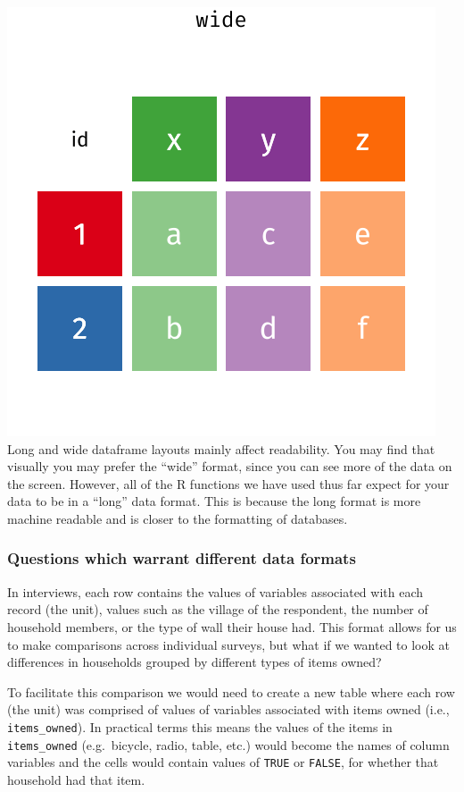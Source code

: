 \documentclass[
]{article}
\begin{document}
\includegraphics{fig/tidyr-pivot_wider_longer.gif} Long and wide
dataframe layouts mainly affect readability. You may find that visually
you may prefer the ``wide'' format, since you can see more of the data
on the screen. However, all of the R functions we have used thus far
expect for your data to be in a ``long'' data format. This is because
the long format is more machine readable and is closer to the formatting
of databases.

\subsubsection{Questions which warrant different data
formats}\label{questions-which-warrant-different-data-formats}

In interviews, each row contains the values of variables associated with
each record (the unit), values such as the village of the respondent,
the number of household members, or the type of wall their house had.
This format allows for us to make comparisons across individual surveys,
but what if we wanted to look at differences in households grouped by
different types of items owned?

To facilitate this comparison we would need to create a new table where
each row (the unit) was comprised of values of variables associated with
items owned (i.e., \texttt{items\_owned}). In practical terms this means
the values of the items in \texttt{items\_owned} (e.g.~bicycle, radio,
table, etc.) would become the names of column variables and the cells
would contain values of \texttt{TRUE} or \texttt{FALSE}, for whether
that household had that item.
\end{document}
